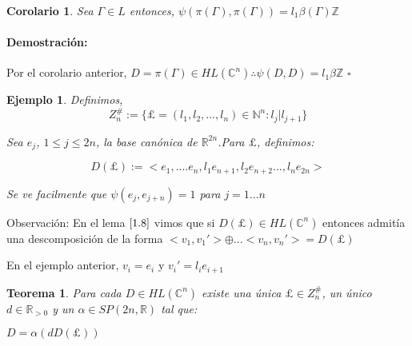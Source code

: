 \documentclass[12pt]{article}
\newtheorem{theorem}{Teorema}
\newtheorem{corollary}{Corolario}
\newtheorem{example}{Ejemplo}
\newenvironment{proof}{\paragraph{Demostración:}}{\hfill$\square$}
\begin{document}
 \begin{corollary}
  Sea $\Gamma  \in L$ entonces, $\psi(\pi(\Gamma),\pi(\Gamma))=l_1 \beta(\Gamma) \mathbb{Z}$  
 \end{corollary}
 \begin{proof}
  Por el corolario anterior, $D=\pi(\Gamma) \in HL(\mathbb{C}^n) \therefore \psi(D,D)=l_1 \beta \mathbb{Z}$  
 \end{proof}


\begin{example} 
 Definimos,
 $$Z_n^{\#}:= \{ \pounds=(l_1,l_2,...,l_n) \in \mathbb{N}^n:l_j|l_{j+1} \}$$
 
 Sea $e_j$, $1\leq j \leq 2n $,  la base canónica de $\mathbb{R}^{2n}$.Para $\pounds$, definimos:
 
 $$D(\pounds):=<e_1,....e_n,l_1 e_{n+1},l_2 e_{n+2}...,l_n e_{2n}>$$
  \newpage
 
 Se ve facilmente que $\psi(e_j,e_{j+n})=1$ para $j=1...n$
\end{example}

 Observación: En el lema $\ref{1.8}$ vimos que si $D(\pounds) \in HL(\mathbb{C}^n)$ entonces admitía una descomposición de la forma 
 $<v_1,v_1'>\oplus ... <v_n,v_n'>= D(\pounds)$
 
 En el ejemplo anterior, $v_i=e_i$ y $v_i'=l_i e_{i+1}$
 

\begin{theorem}
 Para cada $D \in HL(\mathbb{C}^n)$ existe una única $\pounds \in Z_n^{\#}$, un único $d \in \mathbb{R}_{>0}$ y un $\alpha \in SP(2n,\mathbb{R})$ tal que:
 
 $D=\alpha(d D(\pounds))$
\end{theorem}
\end{document}
